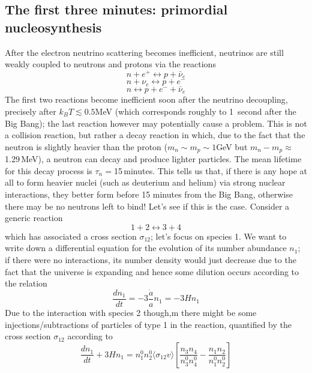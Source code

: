 \documentclass[11pt, a4paper,oneside,openright]{book}
\numberwithin{equation}{section}
\begin{document}
\subsection{The first three minutes: primordial nucleosynthesis}
After the electron neutrino scattering becomes inefficient, neutrinos are still weakly coupled to neutrons and protons via the reactions 
\begin{equation}
\label{proton1}
n+e^+\leftrightarrow p+\bar{\nu}_e
\end{equation}
\begin{equation}
\label{proton2}
n+\nu_e\leftrightarrow p+e^-
\end{equation}
\begin{equation}
n\leftrightarrow p+e^-+\bar{\nu}_e
\end{equation}
The first two reactions become inefficient soon after the neutrino decoupling, precisely after $k_BT\lesssim 0.5$MeV (which corresponds roughly to 1\, second after the Big Bang); the last reaction however may potentially cause a problem. This is not a collision reaction, but rather a decay reaction in which, due to the fact that the neutron is slightly heavier than the proton ($m_n\sim m_p\sim 1$GeV but $m_n-m_p\approx$1.29\,MeV), a neutron can decay and produce lighter particles. The mean lifetime for this decay process is $\tau_n=$15\,minutes. This tells us that, if there is any hope at all to form heavier nuclei (such as deuterium and helium) via strong nuclear interactions, they better form before 15 minutes from the Big Bang, otherwise there may be no neutrons left to bind! Let's see if this is the case. Consider a generic reaction 
\begin{equation}
1+2\leftrightarrow 3+4
\end{equation}
which has associated a cross section $\sigma_{12}$; let's focus on species 1. We want to write down a differential equation for the evolution of its number abundance $n_1$; if there were no interactions, its number density would just decrease due to the fact that the universe is expanding and hence some dilution occurs according to the relation 
\begin{equation}
\label{ateq}
\frac{dn_1}{dt}=-3\frac{\dot{a}}{a}n_1=-3Hn_1
\end{equation}
Due to the interaction with species 2 though,m there might be some injections/subtractions of particles of type 1 in the reaction, quantified by the cross section $\sigma_{12}$ according to 
\begin{equation}
\label{balancenoneq}
\frac{dn_1}{dt}+3Hn_1=n_1^0n_2^0\langle \sigma_{12}v\rangle\left[\frac{n_3n_4}{n_3^0n_4^0}-\frac{n_1n_2}{n_1^0n_2^0}\right]
\end{equation} 
\end{document}
